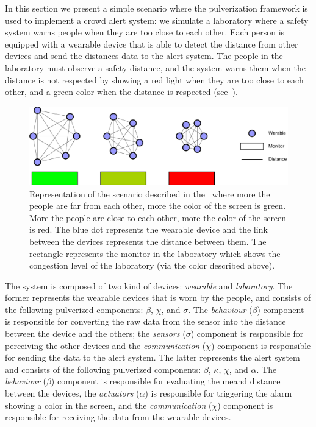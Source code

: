 \documentclass[conference]{IEEEtran}
\begin{document}
In this section we present a simple scenario where the pulverization framework is used to implement a crowd alert system:
we simulate a laboratory where a safety system warns people when they are too close to each other.
%
Each person is equipped with a wearable device that is able to detect the distance from other devices and send the distances data to the
alert system.
%
The people in the laboratory must observe a safety distance, and the system warns them when the distance is not respected by showing a red light
when they are too close to each other, and a green color when the distance is respected (see~).
%
\begin{figure}[ht]
    \centering
    \includegraphics[width=.8\textwidth]{figures/crow-laboratory-demo.drawio.pdf}
    \caption{
        Representation of the scenario described in the~
        where more the people are far from each other, more the color of the screen is green.
        More the people are close to each other, more the color of the screen is red.
        The blue dot represents the wearable device and the link between the devices represents the distance between them.
        The rectangle represents the monitor in the laboratory which shows the congestion level of the laboratory (via the color described above).
    }
    \label{fig:crowd-alert}
\end{figure}
%
The system is composed of two kind of devices: \emph{wearable} and \emph{laboratory}.
%
The former represents the wearable devices that is worn by the people, and consists of the following pulverized components:
$\beta$, $\chi$, and $\sigma$.
%
The \emph{behaviour} ($\beta$) component is responsible for converting the raw data from the sensor into the distance
between the device and the others; the \emph{sensors} ($\sigma$) component is responsible for perceiving the other devices and
the \emph{communication} ($\chi$) component is responsible for sending the data to the alert system.
%
The latter represents the alert system and consists of the following pulverized components:
$\beta$, $\kappa$, $\chi$, and $\alpha$.
%
The \emph{behaviour} ($\beta$) component is responsible for evaluating the meand distance between the devices,
the \emph{actuators} ($\alpha$) is responsible for triggering the alarm showing a color in the screen,
and the \emph{communication} ($\chi$) component is responsible for receiving the data from the wearable devices.
\end{document}

